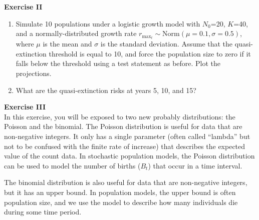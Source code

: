 \documentclass[12pt]{article}\usepackage[]{graphicx}\usepackage[]{color}
\begin{document}
\vspace{12pt}


{\bf Exercise II \\}
\begin{enumerate}
  \item Simulate 10 populations under a logistic growth model with
    $N_0$=20, $K$=40, and a normally-distributed growth rate $r_{\mathrm{max}_t}
    \sim \mathrm{Norm}(\mu=0.1, \sigma=0.5)$, where $\mu$ is the mean
    and $\sigma$ is the standard deviation. Assume that the
    quasi-extinction threshold is
    equal to 10, and force the population size to zero if it falls
    below the threshold using a test statement as before. Plot the
    projections.
  \item What are the quasi-extinction risks at years 5, 10, and 15?
\end{enumerate}


\newpage


{\bf Exercise III \\}
In this exercise, you will be exposed to two new probably
distributions: the Poisson and the binomial. The Poisson distribution
is useful for data that are non-negative integers. It only has
a single parameter (often called ``lambda'' but not to be confused with the
finite rate of increase) that describes the expected value of the
count data. In stochastic population models, the Poisson distribution
can be used to model the number of births ($B_t$) that occur in a time
interval. 

The binomial distribution is also useful for data that are
non-negative integers, but it has an upper bound. In population
models, the upper bound is often population size, and we use the model
to describe how many individuals die during some time period.
\end{document}
